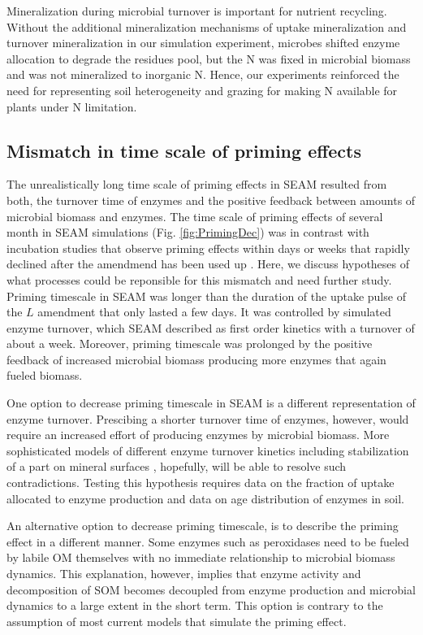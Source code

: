 Mineralization during microbial turnover is important for nutrient recycling.
Without the additional mineralization mechanisms of uptake mineralization
\citep{Manzoni08} and turnover mineralization \citep{Clarholm85, Raynaud06} in
our simulation experiment, microbes shifted enzyme allocation to degrade the
residues pool, but the N was fixed in microbial biomass and was not mineralized
to inorganic N. Hence, our experiments reinforced the need for representing soil
heterogeneity and grazing for making N available for plants under N limitation.

\subsection{Mismatch in time scale of priming effects}
The unrealistically long time scale of priming effects in SEAM resulted from
both, the turnover time of enzymes and the positive feedback between amounts of
microbial biomass and enzymes. The time scale of priming effects of several
month in SEAM simulations (Fig. \ref{fig:PrimingDec}) was in contrast with incubation
studies that observe priming effects within days or weeks that rapidly
declined after the amendmend has been used up \citep{Blagodatskaya14}. Here, we
discuss hypotheses of what processes could be reponsible for this mismatch and
need further study.
Priming timescale in SEAM was longer than the duration of the uptake pulse of
the $L$ amendment that only lasted a few days. It was controlled by simulated
enzyme turnover, which SEAM described as first order kinetics with a turnover of
about a week. Moreover, priming timescale was prolonged by the
positive feedback of increased microbial biomass producing more enzymes that
again fueled biomass.

One option to decrease priming timescale in SEAM is a different representation
of enzyme turnover. Prescibing a shorter turnover time of enzymes, however,
would require an increased effort of producing enzymes by microbial biomass.
More sophisticated models of different enzyme turnover kinetics including
stabilization of a part on mineral surfaces \citep{Burns13}, hopefully, will be
able to resolve such contradictions. Testing this hypothesis requires data on
the fraction of uptake allocated to enzyme production and data on age distribution
of enzymes in soil.

An alternative option to decrease priming timescale, is to describe the priming
effect in a different manner. Some enzymes such as peroxidases need to be
fueled by labile OM themselves \citep{Rousk14} with no
immediate relationship to microbial biomass dynamics. This explanation, however, implies that enzyme
activity and decomposition of SOM becomes decoupled from enzyme production and
microbial dynamics to a large extent in the short term.
This option is contrary to the assumption of most current models that simulate
the priming effect. 

